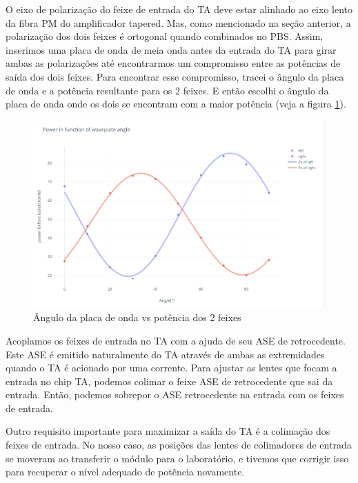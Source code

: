 O eixo de polarização do feixe de entrada do \gls{TA} deve estar alinhado ao eixo lento da fibra PM do amplificador tapered. Mas, como mencionado na seção anterior, a polarização dos dois feixes é ortogonal quando combinados no \gls{PBS}. Assim, inserimos uma placa de onda de meia onda antes da entrada do TA para girar ambas as polarizações até encontrarmos um compromisso entre as potências de saída dos dois feixes. Para encontrar esse compromisso, tracei o ângulo da placa de onda e a potência resultante para os 2 feixes. E então escolhi o ângulo da placa de onda onde os dois se encontram com a maior potência (veja a figura \ref{fig:compromise}).

\begin{figure}
    \centering
    \includegraphics[width=0.5\linewidth]{figures/non_normalized_waveplate.PNG}
    \caption{Ângulo da placa de onda vs potência dos 2 feixes}
    \label{fig:compromise}
\end{figure}

Acoplamos os feixes de entrada no \gls{TA} com a ajuda de seu \gls{ASE} de retrocedente. Este \gls{ASE} é emitido naturalmente do TA através de ambas as extremidades quando o \gls{TA} é acionado por uma corrente. Para ajustar as lentes que focam a entrada no chip \gls{TA}, podemos colimar o feixe \gls{ASE} de retrocedente que sai da entrada.  
Então, podemos sobrepor o \gls{ASE} retrocedente na entrada com os feixes de entrada.

Outro requisito importante para maximizar a saída do \gls{TA} é a colimação dos feixes de entrada. No nosso caso, as posições das lentes de colimadores de entrada se moveram ao transferir o módulo para o laboratório, e tivemos que corrigir isso para recuperar o nível adequado de potência novamente.

